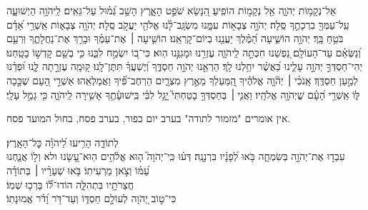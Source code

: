 \documentclass[twoside, openany, parskip=half, 11pt]{book}
\begin{document}
אֵל־נְקָמ֥וֹת יְהֹוָ֑ה אֵ֖ל נְקָמ֣וֹת הוֹפִֽיעַ׃ \hfill \break
 הִ֭נָּשֵׂא שֹׁפֵ֣ט הָאָ֑רֶץ הָשֵׁ֥ב גְּ֝מ֗וּל עַל־גֵּאִֽים׃   \hfill \break
{}לַֽיהֹוָ֥ה הַיְשׁוּעָ֑ה עַֽל־עַמְּךָ֖ בִרְכָתֶ֣ךָ סֶּֽלָה׃   \hfill \break
{} יְהֹוָ֣ה צְבָא֣וֹת עִמָּ֑נוּ מִשְׂגָּֽב־לָ֨נוּ אֱלֹהֵ֖י יַעֲקֹ֣ב סֶֽלָה׃   \hfill \break
{} יְהֹוָ֥ה צְבָא֑וֹת אַֽשְׁרֵ֥י אָ֝דָ֗ם בֹּטֵ֥חַ בָּֽךְ׃  \hfill \break
{} יְהֹוָ֥ה הוֹשִׁ֑יעָה הַ֝מֶּ֗לֶךְ יַעֲנֵ֥נוּ בְיוֹם־קׇרְאֵֽנוּ׃   \hfill \break
{}הוֹשִׁ֤יעָה ׀ אֶת־עַמֶּ֗ךָ וּבָרֵ֥ךְ אֶת־נַחֲלָתֶ֑ךָ וּֽרְעֵ֥ם וְ֝נַשְּׂאֵ֗ם עַד־הָעוֹלָֽם׃   \hfill \break
{}נַ֭פְשֵׁנוּ חִכְּתָ֣ה לַֽיהֹוָ֑ה עֶזְרֵ֖נוּ וּמָגִנֵּ֣נוּ הֽוּא׃  \hfill \break
 כִּי־ב֭וֹ יִשְׂמַ֣ח לִבֵּ֑נוּ כִּ֤י בְשֵׁ֖ם קׇדְשׁ֣וֹ בָטָֽחְנוּ׃  \hfill \break
 יְהִי־חַסְדְּךָ֣ יְהֹוָ֣ה עָלֵ֑ינוּ כַּ֝אֲשֶׁ֗ר יִחַ֥לְנוּ לָֽךְ׃  \hfill \break
{}הַרְאֵ֣נוּ יְהֹוָ֣ה חַסְדֶּ֑ךָ וְ֝יֶשְׁעֲךָ֗ תִּתֶּן־לָֽנוּ׃   \hfill \break
{}ק֭וּמָֽה עֶזְרָ֣תָה לָּ֑נוּ וּ֝פְדֵ֗נוּ לְמַ֣עַן חַסְדֶּֽךָ׃   \hfill \break
{}אָֽנֹכִ֨י ׀ יְהֹ֘וָ֤ה אֱלֹהֶ֗יךָ הַֽ֭מַּעַלְךָ מֵאֶ֣רֶץ מִצְרָ֑יִם הַרְחֶב־פִּ֗֝יךָ וַאֲמַלְאֵֽהוּ׃   \hfill \break
{}אַשְׁרֵ֣י הָ֭עָם שֶׁכָּ֣כָה לּ֑וֹ אַֽשְׁרֵ֥י הָ֝עָ֗ם שֱׁיְהֹוָ֥ה אֱלֹהָֽיו׃   \hfill \break
{}וַאֲנִ֤י ׀ בְּחַסְדְּךָ֣ בָטַחְתִּי֮ יָ֤גֵ֥ל לִבִּ֗י בִּֽישׁוּעָ֫תֶ֥ךָ אָשִׁ֥ירָה לַֽיהֹוָ֑ה כִּ֖י גָמַ֣ל עָלָֽי׃   \hfill \break

\negline

\begin{narrow}
\begin{scriptsize} %
\textsf{
אין אומרים  "מזמור לתודה" בערב יום כפור, בערב פסח,  בחול המועד פסח.\\
}\end{scriptsize}
 לְתוֹדָ֑ה \hfill
הָרִ֥יעוּ לַ֝יהֹוָ֗ה כׇּל־הָאָֽרֶץ׃\\
עִבְד֣וּ אֶת־יְהֹוָ֣ה בְּשִׂמְחָ֑ה \hfill בֹּ֥אוּ לְ֝פָנָ֗יו בִּרְנָנָֽה׃
דְּע֗וּ כִּֽי־יְהֹוָה֮ ה֤וּא אֱלֹ֫הִ֥ים \hfill הֽוּא־עָ֭שָׂנוּ ולא וְל֣וֹ אֲנַ֑חְנוּ\\ עַ֝מּ֗וֹ וְצֹ֣אן מַרְעִיתֽוֹ׃ \hfill
בֹּ֤אוּ שְׁעָרָ֨יו ׀ בְּתוֹדָ֗ה \\ חֲצֵרֹתָ֥יו בִּתְהִלָּ֑ה \hfill הוֹדוּ־ל֗֝וֹ בָּרְכ֥וּ שְׁמֽוֹ׃\\
כִּי־ט֣וֹב יְ֭הֹוָה לְעוֹלָ֣ם חַסְדּ֑וֹ \hfill וְעַד־דֹּ֥ר וָ֝דֹ֗ר אֱמוּנָתֽוֹ׃ 
\end{narrow}
\end{document}
